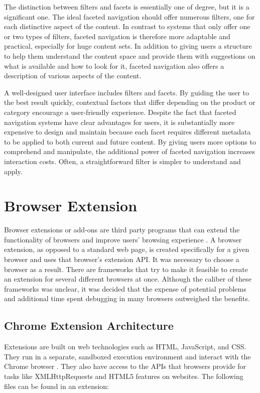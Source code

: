 The distinction between filters and facets is essentially one of degree, but it is a significant one. The ideal faceted navigation should offer numerous filters, one for each distinctive aspect of the content. In contrast to systems that only offer one or two types of filters, faceted navigation is therefore more adaptable and practical, especially for huge content sets. In addition to giving users a structure to help them understand the content space and provide them with suggestions on what is available and how to look for it, faceted navigation also offers a description of various aspects of the content.

A well-designed user interface includes filters and facets. By guiding the user to the best result quickly, contextual factors that differ depending on the product or category encourage a user-friendly experience. Despite the fact that faceted navigation systems have clear advantages for users, it is substantially more expensive to design and maintain because each facet requires different metadata to be applied to both current and future content. By giving users more options to comprehend and manipulate, the additional power of faceted navigation increases interaction costs. Often, a straightforward filter is simpler to understand and apply.


\section{Browser Extension}
Browser extensions or add-ons are third party programs that can extend the functionality of browsers and improve users' browsing experience \autocite{some2019empoweb}. A browser extension, as opposed to a standard web page, is created specifically for a given browser and uses that browser's extension API. It was necessary to choose a browser as a result. There are frameworks that try to make it feasible to create an extension for several different browsers at once. Although the caliber of these frameworks was unclear, it was decided that the expense of potential problems and additional time spent debugging in many browsers outweighed the benefits.

\subsection{Chrome Extension Architecture}
Extensions are built on web technologies such as HTML, JavaScript, and CSS. They run in a separate, sandboxed execution environment and interact with the Chrome browser \autocite{google2021what}. They also have access to the APIs that browsers provide for tasks like XMLHttpRequests and HTML5 features on websites. The following files can be found in an extension:

